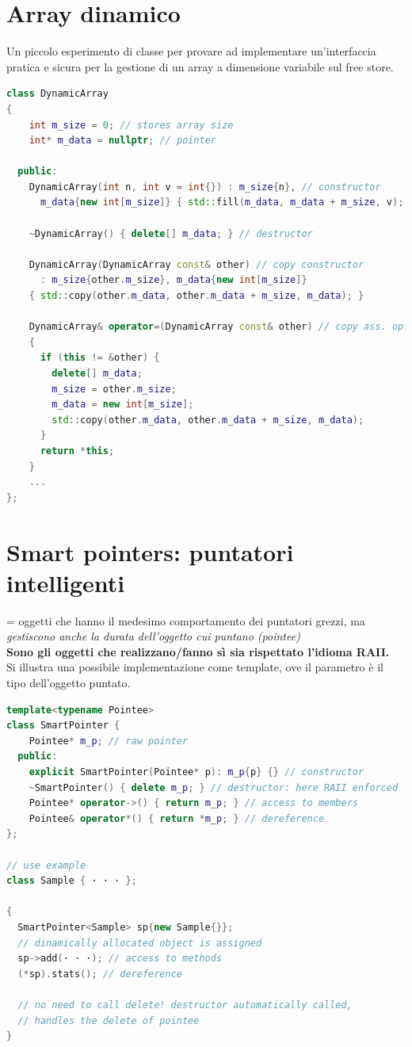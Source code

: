 \documentclass[10pt, oneside]{book}
\begin{document}
\section{Array dinamico}
Un piccolo esperimento di classe per provare ad implementare un'interfaccia pratica e sicura per la gestione di un array a dimensione variabile sul free store.
\begin{lstlisting}[language=C++]
class DynamicArray
{
    int m_size = 0; // stores array size
    int* m_data = nullptr; // pointer
    
  public:
    DynamicArray(int n, int v = int{}) : m_size{n}, // constructor
      m_data{new int[m_size]} { std::fill(m_data, m_data + m_size, v); }
      
    ~DynamicArray() { delete[] m_data; } // destructor
    
    DynamicArray(DynamicArray const& other) // copy constructor
      : m_size{other.m_size}, m_data{new int[m_size]}
    { std::copy(other.m_data, other.m_data + m_size, m_data); }
    
    DynamicArray& operator=(DynamicArray const& other) // copy ass. op.
    {
      if (this != &other) {
        delete[] m_data;
        m_size = other.m_size;
        m_data = new int[m_size];
        std::copy(other.m_data, other.m_data + m_size, m_data);
      }
      return *this;
    }
    ...
};
\end{lstlisting}

\section{Smart pointers: puntatori intelligenti}
= oggetti che hanno il medesimo comportamento dei puntatori grezzi, ma \textit{gestiscono anche la durata dell'oggetto cui puntano (pointee)}\\
\textbf{Sono gli oggetti che realizzano/fanno sì sia rispettato l'idioma RAII.}
\\Si illustra una possibile implementazione come template, ove il parametro è il tipo dell'oggetto puntato.
\begin{lstlisting}[language=C++]
template<typename Pointee>
class SmartPointer {
    Pointee* m_p; // raw pointer
  public:
    explicit SmartPointer(Pointee* p): m_p{p} {} // constructor
    ~SmartPointer() { delete m_p; } // destructor: here RAII enforced
    Pointee* operator->() { return m_p; } // access to members
    Pointee& operator*() { return *m_p; } // dereference
};

// use example
class Sample { · · · };

{
  SmartPointer<Sample> sp{new Sample{}};
  // dinamically allocated object is assigned
  sp->add(· · ·); // access to methods
  (*sp).stats(); // dereference
  
  // no need to call delete! destructor automatically called, 
  // handles the delete of pointee
}

\end{lstlisting}
\end{document}
